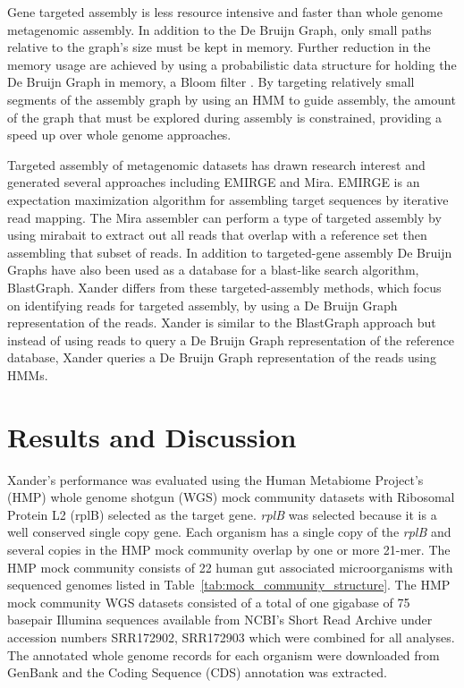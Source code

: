 \documentclass[10pt]{bmc_article}
\newenvironment{bmcformat}{\begin{raggedright}\baselineskip20pt\sloppy\setboolean{publ}{false}}{\end{raggedright}\baselineskip20pt\sloppy}
\begin{document}
\begin{bmcformat}
Gene targeted assembly is less resource intensive and faster than whole genome metagenomic assembly.  In addition to the De Bruijn Graph, only small paths relative to the graph's size must be kept in memory.  Further reduction in the memory usage are achieved by using a probabilistic data structure for holding the De Bruijn Graph in memory, a Bloom filter \cite{bloom_space/time_1970,pell_scaling_2012}.  By targeting relatively small segments of the assembly graph by using an HMM to guide assembly, the amount of the graph that must be explored during assembly is constrained, providing a speed up over whole genome approaches.

Targeted assembly of metagenomic datasets has drawn research interest and generated several approaches including EMIRGE\cite{miller_emirge:_2011} and Mira\cite{chevreux_using_2004}. EMIRGE is an expectation maximization algorithm for assembling target sequences by iterative read mapping.  The Mira assembler can perform a type of targeted assembly by using mirabait to extract out all reads that overlap with a reference set then assembling that subset of reads.  In addition to targeted-gene assembly De Bruijn Graphs have also been used as a database for a blast-like search algorithm, BlastGraph\cite{holley_blastgraph:_2012}.  Xander differs from these targeted-assembly methods, which focus on identifying reads for targeted assembly, by using a De Bruijn Graph representation of the reads.  Xander is similar to the BlastGraph approach but instead of using reads to query a De Bruijn Graph representation of the reference database, Xander queries a De Bruijn Graph representation of the reads using HMMs.
\section*{Results and Discussion}
Xander's performance was evaluated using the Human Metabiome Project's (HMP) whole genome shotgun (WGS) mock community datasets with Ribosomal Protein L2 (rplB) selected as the target gene.  \emph{rplB} was selected because it is a well conserved single copy gene.  Each organism has a single copy of the \emph{rplB} and several copies in the HMP mock community overlap by one or more 21-mer. The HMP mock community consists of 22 human gut associated microorganisms with sequenced genomes listed in Table~\ref{tab:mock_community_structure}.  The HMP mock community WGS datasets consisted of a total of one gigabase of 75 basepair Illumina sequences available from NCBI's Short Read Archive under accession numbers SRR172902, SRR172903 which were combined for all analyses.  The annotated whole genome records for each organism were downloaded from GenBank and the Coding Sequence (CDS) annotation was extracted.


\end{bmcformat}
\end{document}
